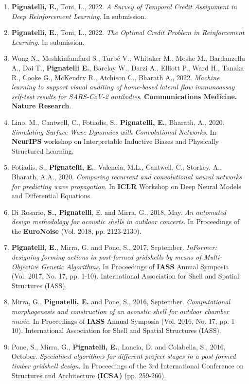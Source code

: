 \begin{enumerate}[leftmargin=0.45cm, itemsep=0em, topsep=0.5em, parsep=0.2em]
    \item \textbf{Pignatelli, E.}, Toni, L., 2022. \textit{A Survey of Temporal Credit Assignment in Deep Reinforcement Learning}. In submission.
    \item \textbf{Pignatelli, E.}, Toni, L., 2022. \textit{The Optimal Credit Problem in Reinforcement Learning}. In submission.
    \item Wong N., Meshkinfamfard S., Turbé V., Whitaker M., Moshe M., Bardanzellu A., Dai T., \textbf{Pignatelli E.}, Barclay W., Darzi A., Elliott P., Ward H., Tanaka R., Cooke G., McKendry R., Atchison C., Bharath A., 2022. \textit{Machine learning to support visual auditing of home-based lateral flow immunoassay self-test results for SARS-CoV-2 antibodies}. \textbf{Communications Medicine. Nature Research}.
    \item Lino, M., Cantwell, C., Fotiadis, S., \textbf{Pignatelli, E.}, Bharath, A., 2020. \textit{Simulating Surface Wave Dynamics with Convolutional Networks}. In \textbf{NeurIPS} workshop on Interpretable Inductive Biases and Physically Structured Learning.
    \item Fotiadis, S., \textbf{Pignatelli, E.}, Valencia, M.L., Cantwell, C., Storkey, A., Bharath, A.A., 2020. \textit{Comparing recurrent and convolutional neural networks for predicting wave propagation}. In \textbf{ICLR} Workshop on Deep Neural Models and Differential Equations.
    \item Di Rosario, \textbf{S., Pignatelli}, E. and Mirra, G., 2018, May. \textit{An automated design methodology for acoustic shells in outdoor concerts}. In Proceedings of the \textbf{EuroNoise} (Vol. 2018, pp. 2123-2130).
    \item \textbf{Pignatelli, E.}, Mirra, G. and Pone, S., 2017, September. \textit{InFormer: designing forming actions in post-formed gridshells by means of Multi-Objective Genetic Algorithms}. In Proceedings of \textbf{IASS} Annual Symposia (Vol. 2017, No. 17, pp. 1-10). International Association for Shell and Spatial Structures (IASS).
    \item Mirra, G., \textbf{Pignatelli, E.} and Pone, S., 2016, September. \textit{Computational morphogenesis and construction of an acoustic shell for outdoor chamber music}. In Proceedings of \textbf{IASS} Annual Symposia (Vol. 2016, No. 17, pp. 1-10). International Association for Shell and Spatial Structures (IASS).
    \item Pone, S., Mirra, G., \textbf{Pignatelli, E.}, Lancia, D. and Colabella, S., 2016, October. \textit{Specialised algorithms for different project stages in a post-formed timber gridshell design}. In Proceedings of the 3rd International Conference on Structures and Architecture \textbf{(ICSA)} (pp. 259-266).

\end{enumerate}
